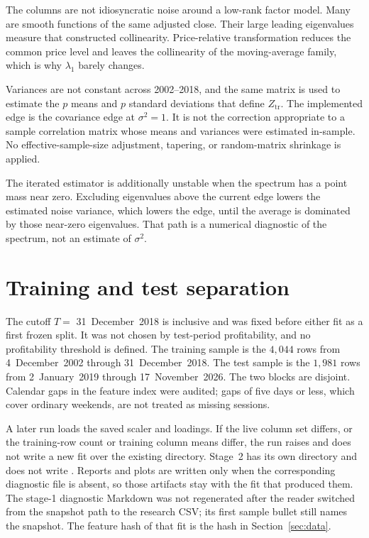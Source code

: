 \documentclass[11pt]{article}
\begin{document}
The columns are not idiosyncratic noise around a low-rank factor model.
Many are smooth functions of the same adjusted close.
Their large leading eigenvalues measure that constructed collinearity.
Price-relative transformation reduces the common price level and leaves the collinearity of the moving-average family, which is why \(\lambda_1\) barely changes.

Variances are not constant across 2002--2018, and the same matrix is used to estimate the \(p\) means and \(p\) standard deviations that define \(Z_{\mathrm{tr}}\).
The implemented edge is the covariance edge at \(\sigma^2=1\).
It is not the correction appropriate to a sample correlation matrix whose means and variances were estimated in-sample.
No effective-sample-size adjustment, tapering, or random-matrix shrinkage is applied.

The iterated estimator is additionally unstable when the spectrum has a point mass near zero.
Excluding eigenvalues above the current edge lowers the estimated noise variance, which lowers the edge, until the average is dominated by those near-zero eigenvalues.
That path is a numerical diagnostic of the spectrum, not an estimate of \(\sigma^2\).

\section{Training and test separation}
\label{sec:split}

The cutoff \(T=\) 31~December~2018 is inclusive and was fixed before either fit as a first frozen split.
It was not chosen by test-period profitability, and no profitability threshold is defined.
The training sample is the \(4{,}044\) rows from 4~December~2002 through 31~December~2018.
The test sample is the \(1{,}981\) rows from 2~January~2019 through 17~November~2026.
The two blocks are disjoint.
Calendar gaps in the feature index were audited; gaps of five days or less, which cover ordinary weekends, are not treated as missing sessions.

A later run loads the saved scaler and loadings.
If the live column set differs, or the training-row count or training column means differ, the run raises and does not write a new fit over the existing directory.
Stage~2 has its own directory and does not write .
Reports and plots are written only when the corresponding diagnostic file is absent, so those artifacts stay with the fit that produced them.
The stage-1 diagnostic Markdown was not regenerated after the reader switched from the snapshot path to the research CSV; its first sample bullet still names the snapshot.
The feature hash of that fit is the hash in Section~\ref{sec:data}.
\end{document}
